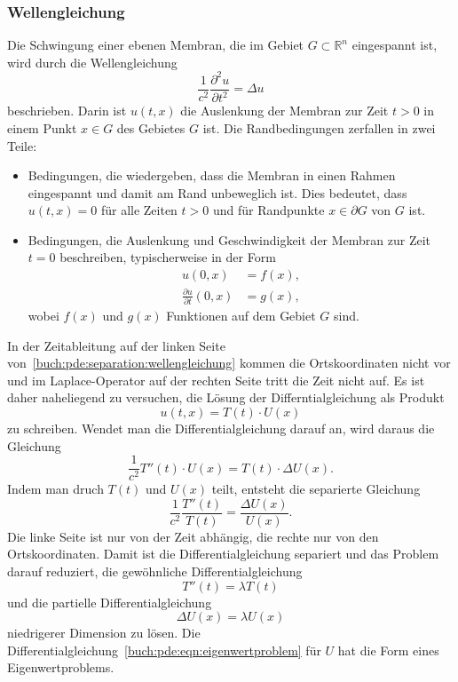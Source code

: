 \subsubsection{Wellengleichung}
Die Schwingung einer ebenen Membran, die im Gebiet
$G\subset\mathbb{R}^n$ eingespannt ist, wird durch die
Wellengleichung
\begin{equation}
\frac{1}{c^2} \frac{\partial^2 u}{\partial t^2} = \Delta u
\label{buch:pde:separation:wellengleichung}
\end{equation}
beschrieben.
Darin ist $u(t,x)$ die Auslenkung der Membran zur Zeit $t>0$ in einem
Punkt $x\in G$ des Gebietes $G$ ist.
Die Randbedingungen zerfallen in zwei Teile:
\begin{itemize}
\item
Bedingungen, die wiedergeben, dass die Membran in einen 
Rahmen eingespannt und damit am Rand unbeweglich ist.
Dies bedeutet, dass $u(t,x)=0$ für alle Zeiten $t>0$ und für 
Randpunkte $x\in\partial G$ von $G$ ist.
\item
Bedingungen, die Auslenkung und Geschwindigkeit der Membran zur
Zeit $t=0$ beschreiben, typischerweise in der Form
\begin{align*}
u(0,x) &= f(x),
\\
\frac{\partial u}{\partial t}(0,x) &= g(x),
\end{align*}
wobei $f(x)$ und $g(x)$ Funktionen auf dem Gebiet $G$ sind.
\end{itemize}

In der Zeitableitung auf der linken Seite
von~\eqref{buch:pde:separation:wellengleichung}
kommen die Ortskoordinaten nicht vor und im Laplace-Operator
auf der rechten Seite tritt die Zeit nicht auf.
Es ist daher naheliegend zu versuchen, die Lösung der Differntialgleichung
als Produkt
\[
u(t,x) = T(t) \cdot U(x)
\]
zu schreiben.
Wendet man die Differentialgleichung darauf an, wird daraus die Gleichung
\[
\frac{1}{c^2}
T''(t)\cdot U(x)
=
T(t) \cdot \Delta U(x).
\]
Indem man druch $T(t)$ und $U(x)$ teilt, entsteht die separierte Gleichung
\[
\frac{1}{c^2} \frac{T''(t)}{T(t)}
=
\frac{\Delta U(x)}{U(x)}.
\]
Die linke Seite ist nur von der Zeit abhängig, die rechte nur von den
Ortskoordinaten.
Damit ist die Differentialgleichung separiert und das Problem darauf
reduziert, die gewöhnliche Differentialgleichung 
\[
T''(t) = \lambda T(t)
\]
und die partielle Differentialgleichung
\begin{equation}
\Delta U(x) = \lambda U(x)
\label{buch:pde:eqn:eigenwertproblem}
\end{equation}
niedrigerer Dimension zu lösen.
Die Differentialgleichung~\eqref{buch:pde:eqn:eigenwertproblem}
für $U$ hat die Form eines Eigenwertproblems.

